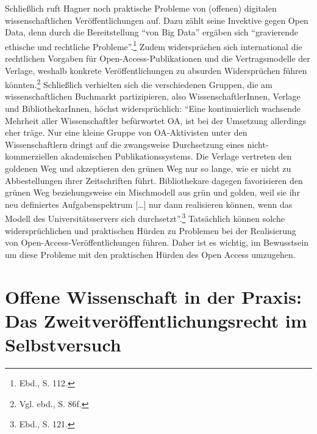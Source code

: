 \documentclass[a4paper,
fontsize=11pt,
oneside,
numbers=noperiodatend,
parskip=half-,
bibliography=totoc,
final
]{scrartcl}
\begin{document}
Schließlich ruft Hagner noch praktische Probleme von (offenen) digitalen
wissenschaftlichen Veröffentlichungen auf. Dazu zählt seine Invektive
gegen Open Data, denn durch die Bereitstellung \enquote{von Big Data}
ergäben sich \enquote{gravierende ethische und rechtliche
Probleme}.\footnote{Ebd., S. 112.} Zudem widersprächen sich
international die rechtlichen Vorgaben für Open-Access-Publikationen und
die Vertragsmodelle der Verlage, weshalb konkrete Veröffentlichungen zu
absurden Widersprüchen führen könnten.\footnote{Vgl. ebd., S. 86f.}
Schließlich verhielten sich die verschiedenen Gruppen, die am
wissenschaftlichen Buchmarkt partizipieren, also WissenschaftlerInnen,
Verlage und BibliothekarInnen, höchst widersprüchlich: \enquote{Eine
kontinuierlich wachsende Mehrheit aller Wissenschaftler befürwortet OA,
ist bei der Umsetzung allerdings eher träge. Nur eine kleine Gruppe von
OA-Aktivisten unter den Wissenschaftlern dringt auf die zwangsweise
Durchsetzung eines nicht-kommerziellen akademischen Publikationssystems.
Die Verlage vertreten den goldenen Weg und akzeptieren den grünen Weg
nur so lange, wie er nicht zu Abbestellungen ihrer Zeitschriften führt.
Bibliothekare dagegen favorisieren den grünen Weg beziehungsweise ein
Mischmodell aus grün und golden, weil sie ihr neu definiertes
Aufgabenspektrum {[}\ldots{}{]} nur dann realisieren können, wenn das
Modell des Universitätsservers sich durchsetzt}.\footnote{Ebd., S. 121.}
Tatsächlich können solche widersprüchlichen und praktischen Hürden zu
Problemen bei der Realisierung von Open-Access-Veröffentlichungen
führen. Daher ist es wichtig, im Bewusstsein um diese Probleme mit den
praktischen Hürden des Open Access umzugehen.

\section*{Offene Wissenschaft in der Praxis: Das
Zweitveröffentlichungsrecht im
Selbstversuch}\label{offene-wissenschaft-in-der-praxis-das-zweitveruxf6ffentlichungsrecht-im-selbstversuch}
\end{document}
